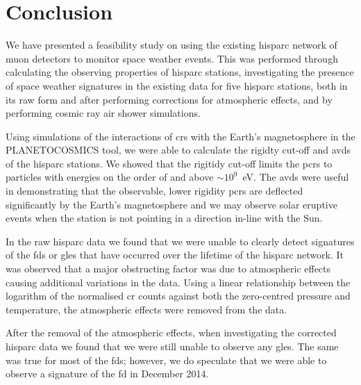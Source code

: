 %




\section{Conclusion}\label{sec:HS_conclusion}

We have presented a feasibility study on using the existing \gls{hisparc} network of muon detectors to monitor space weather events. This was performed through calculating the observing properties of \gls{hisparc} stations, investigating the presence of space weather signatures in the existing data for five \gls{hisparc} stations, both in its raw form and after performing corrections for atmospheric effects, and by performing cosmic ray air shower simulations.

Using simulations of the interactions of \glspl{cr} with the Earth's magnetosphere in the PLANETOCOSMICS tool, we were able to calculate the rigidty cut-off and \glspl{avd} of the \gls{hisparc} stations. We showed that the rigitidy cut-off limits the \glspl{pcr} to particles with energies on the order of and above $\sim 10^9$~eV. The \glspl{avd} were useful in demonstrating that the observable, lower rigidity \glspl{pcr} are deflected significantly by the Earth's magnetosphere and we may observe solar eruptive events when the station is not pointing in a direction in-line with the Sun.

In the raw \gls{hisparc} data we found that we were unable to clearly detect signatures of the \glspl{fd} or \glspl{gle} that have occurred over the lifetime of the \gls{hisparc} network. It was observed that a major obstructing factor was due to atmospheric effects causing additional variations in the data. Using a linear relationship between the logarithm of the normalised \gls{cr} counts against both the zero-centred pressure and temperature, the atmospheric effects were removed from the data.

After the removal of the atmospheric effects, when investigating the corrected \gls{hisparc} data we found that we were still unable to observe any \glspl{gle}. The same was true for most of the \glspl{fd}; however, we do speculate that we were able to observe a signature of the \gls{fd} in December 2014. 

